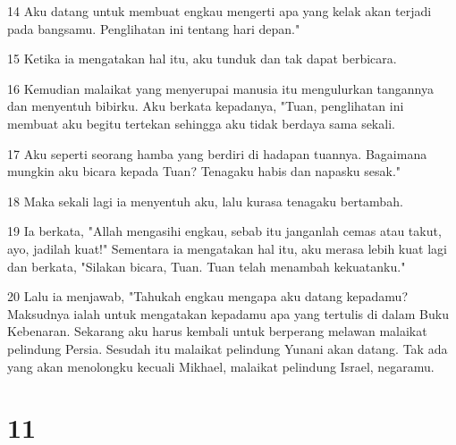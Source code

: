 \par 14 Aku datang untuk membuat engkau mengerti apa yang kelak akan terjadi pada bangsamu. Penglihatan ini tentang hari depan."
\par 15 Ketika ia mengatakan hal itu, aku tunduk dan tak dapat berbicara.
\par 16 Kemudian malaikat yang menyerupai manusia itu mengulurkan tangannya dan menyentuh bibirku. Aku berkata kepadanya, "Tuan, penglihatan ini membuat aku begitu tertekan sehingga aku tidak berdaya sama sekali.
\par 17 Aku seperti seorang hamba yang berdiri di hadapan tuannya. Bagaimana mungkin aku bicara kepada Tuan? Tenagaku habis dan napasku sesak."
\par 18 Maka sekali lagi ia menyentuh aku, lalu kurasa tenagaku bertambah.
\par 19 Ia berkata, "Allah mengasihi engkau, sebab itu janganlah cemas atau takut, ayo, jadilah kuat!" Sementara ia mengatakan hal itu, aku merasa lebih kuat lagi dan berkata, "Silakan bicara, Tuan. Tuan telah menambah kekuatanku."
\par 20 Lalu ia menjawab, "Tahukah engkau mengapa aku datang kepadamu? Maksudnya ialah untuk mengatakan kepadamu apa yang tertulis di dalam Buku Kebenaran. Sekarang aku harus kembali untuk berperang melawan malaikat pelindung Persia. Sesudah itu malaikat pelindung Yunani akan datang. Tak ada yang akan menolongku kecuali Mikhael, malaikat pelindung Israel, negaramu.

\chapter{11}

